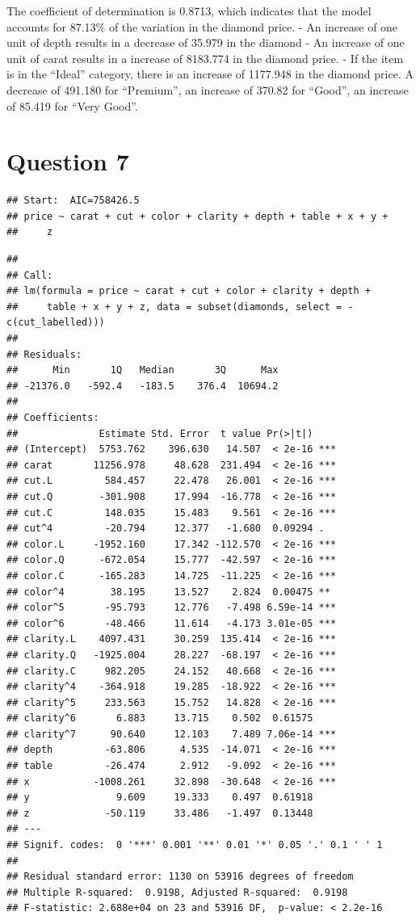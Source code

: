 \documentclass[
]{article}
\begin{document}
The coefficient of determination is 0.8713, which indicates that the
model accounts for 87.13\% of the variation in the diamond price. - An
increase of one unit of depth results in a decrease of 35.979 in the
diamond - An increase of one unit of carat results in a increase of
8183.774 in the diamond price. - If the item is in the ``Ideal''
category, there is an increase of 1177.948 in the diamond price. A
decrease of 491.180 for ``Premium'', an increase of 370.82 for ``Good'',
an increase of 85.419 for ``Very Good''.

\hypertarget{question-7}{%
\section{Question 7}\label{question-7}}

\begin{verbatim}
## Start:  AIC=758426.5
## price ~ carat + cut + color + clarity + depth + table + x + y + 
##     z
\end{verbatim}

\begin{verbatim}
## 
## Call:
## lm(formula = price ~ carat + cut + color + clarity + depth + 
##     table + x + y + z, data = subset(diamonds, select = -c(cut_labelled)))
## 
## Residuals:
##      Min       1Q   Median       3Q      Max 
## -21376.0   -592.4   -183.5    376.4  10694.2 
## 
## Coefficients:
##              Estimate Std. Error  t value Pr(>|t|)    
## (Intercept)  5753.762    396.630   14.507  < 2e-16 ***
## carat       11256.978     48.628  231.494  < 2e-16 ***
## cut.L         584.457     22.478   26.001  < 2e-16 ***
## cut.Q        -301.908     17.994  -16.778  < 2e-16 ***
## cut.C         148.035     15.483    9.561  < 2e-16 ***
## cut^4         -20.794     12.377   -1.680  0.09294 .  
## color.L     -1952.160     17.342 -112.570  < 2e-16 ***
## color.Q      -672.054     15.777  -42.597  < 2e-16 ***
## color.C      -165.283     14.725  -11.225  < 2e-16 ***
## color^4        38.195     13.527    2.824  0.00475 ** 
## color^5       -95.793     12.776   -7.498 6.59e-14 ***
## color^6       -48.466     11.614   -4.173 3.01e-05 ***
## clarity.L    4097.431     30.259  135.414  < 2e-16 ***
## clarity.Q   -1925.004     28.227  -68.197  < 2e-16 ***
## clarity.C     982.205     24.152   40.668  < 2e-16 ***
## clarity^4    -364.918     19.285  -18.922  < 2e-16 ***
## clarity^5     233.563     15.752   14.828  < 2e-16 ***
## clarity^6       6.883     13.715    0.502  0.61575    
## clarity^7      90.640     12.103    7.489 7.06e-14 ***
## depth         -63.806      4.535  -14.071  < 2e-16 ***
## table         -26.474      2.912   -9.092  < 2e-16 ***
## x           -1008.261     32.898  -30.648  < 2e-16 ***
## y               9.609     19.333    0.497  0.61918    
## z             -50.119     33.486   -1.497  0.13448    
## ---
## Signif. codes:  0 '***' 0.001 '**' 0.01 '*' 0.05 '.' 0.1 ' ' 1
## 
## Residual standard error: 1130 on 53916 degrees of freedom
## Multiple R-squared:  0.9198, Adjusted R-squared:  0.9198 
## F-statistic: 2.688e+04 on 23 and 53916 DF,  p-value: < 2.2e-16
\end{verbatim}
\end{document}
